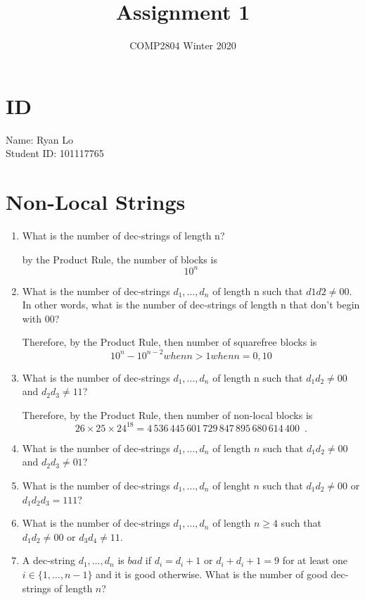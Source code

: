 \documentclass{article}
\title{Assignment 1}
\author{COMP2804 Winter 2020}
\begin{document}
\maketitle

\section{ID}

Name: Ryan Lo \\
Student ID: 101117765

\section{Non-Local Strings}

\begin{enumerate}
  \item What is the number of dec-strings of length n?
  
  by the Product Rule, the number of blocks is
  \[
      10^{n}
  \]

  \item What is the number of dec-strings $d_1,\ldots,d_n$ of length n such that $d1d2\neq00$. In other words, what is the number of dec-strings of length n that don't begin with 00?
 
  Therefore, by the Product Rule, then number of squarefree blocks is 
  \[
      10^{n} - 10^{n-2} when n > 1
      when n = 0, 10
  \]
  
  \item What is the number of dec-strings $d_1,\ldots,d_n$ of length n such that $d_1d_2\neq00$ and $d_2d_3\neq11$?
  
  Therefore, by the Product Rule, then number of non-local blocks is 
  \[
     26\times 25\times 24^{18} = 4\,536\,445\,601\,729\,847\,895\,680\,614\,400
     \enspace .
  \]
  
   \item What is the number of dec-strings $d_1,\ldots,d_n$ of length $n$ such that $d_1d_2\neq00$ and $d_2d_3\neq01$?
   
   \item What is the number of dec-strings $d_1,\ldots,d_n$ of lenght $n$ such that $d_1d_2\neq00$ or $d_1d_2d_3=111$?
   
   \item What is the number of dec-strings $d_1,\ldots,d_n$ of length $n\geq4$ such that $d_1d_2\neq00$ or $d_3d_4\neq11$.
   
   \item A dec-string $d_1,\ldots,d_n$ is $bad$ if $d_i=d_i+1$ or $d_i+d_i+1=9$ for at least one $i\in\{1,\ldots,n-1\}$ and it is good otherwise. What is the number of good dec-strings of length $n$?
   

\end{enumerate}
\end{document}

